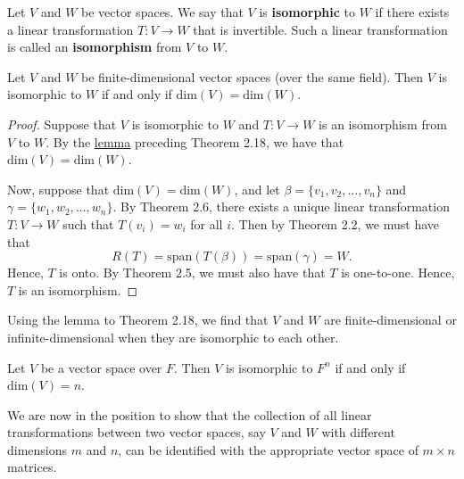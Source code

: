 \begin{definition}[Isomorphisms]
   Let \( V  \) and \( W  \) be vector spaces. We say that \( V  \) is \textbf{isomorphic} to \( W  \) if there exists a linear transformation \( T: V \to W  \) that is invertible. Such a linear transformation is called an \textbf{isomorphism} from \( V  \) to \( W  \). 
\end{definition}

\begin{theorem}
   Let \( V  \) and \( W  \) be finite-dimensional vector spaces (over the same field). Then \( V  \) is isomorphic to \( W  \) if and only if \( \text{dim}(V) = \text{dim}(W) \).  
\end{theorem}
\begin{proof}
    Suppose that \( V  \) is isomorphic to \( W  \) and \( T: V \to W  \) is an isomorphism from \( V  \) to \( W  \). By the {\hyperref[Invertibility Implies dim V = dim W]{lemma}} preceding Theorem 2.18, we have that \( \text{dim}(V) = \text{dim}(W) \).

    Now, suppose that \( \text{dim}(V) = \text{dim}(W) \), and let \( \beta = \{ {v}_{1}, {v}_{2}, \dots, {v}_{n} \} \) and \( \gamma = \{ {w}_{1}, {w}_{2}, \dots, {w}_{n} \}  \). By Theorem 2.6, there exists a unique linear transformation \( T: V \to W  \) such that \( T({v}_{i}) = {w}_{i} \) for all \( i \). Then by Theorem 2.2, we must have that 
    \[  R(T) = \text{span}(T(\beta)) = \text{span}(\gamma) = W. \]
    Hence, \( T  \) is onto. By Theorem 2.5, we must also have that \( T  \) is one-to-one. Hence, \( T  \) is an isomorphism.
\end{proof}

\begin{remark}
    Using the lemma to Theorem 2.18, we find that \( V  \) and \( W  \) are finite-dimensional or infinite-dimensional when they are isomorphic to each other.  
\end{remark}

\begin{corollary}
    Let \( V  \) be a vector space over \( F  \). Then \( V  \) is isomorphic to \( F^{n}  \) if and only if \( \text{dim}(V) = n  \).
\end{corollary}

We are now in the position to show that the collection of all linear transformations between two vector spaces, say \( V  \) and \( W  \) with different dimensions \( m  \) and \( n \), can be identified with the appropriate vector space of \( m \times n  \) matrices.

